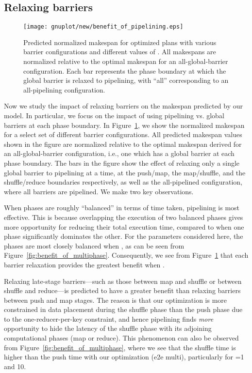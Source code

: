 \subsection{Relaxing barriers}
\label{subsec:barriers}

\begin{figure}[htbp]
  \centering
  \texttt{[image: gnuplot/new/benefit\_of\_pipelining.eps]}
  \caption{Predicted normalized makespan for optimized plans with various
  barrier configurations and different values of .
  All makespans are normalized relative to the optimal makespan for an
  all-global-barrier configuration.  Each bar represents the phase boundary at
  which the global barrier is relaxed to pipelining, with ``all'' corresponding
  to an all-pipelining configuration.
  \label{fig:benefit_of_pipelining}}
\end{figure}

Now we study the impact of relaxing barriers on the makespan predicted by our
model.
In particular, we focus on the impact of using pipelining vs. global barriers
at each phase boundary.
In Figure~\ref{fig:benefit_of_pipelining}, we show the normalized makespan for
a select set of different barrier configurations.
All predicted makespan values shown in the figure are normalized relative to
the optimal makespan derived for an all-global-barrier configuration, i.e., one
which has a global barrier at each phase boundary.
The bars in the figure show the effect of relaxing only a single global barrier
to pipelining at a time, at the push/map, the map/shuffle, and the
shuffle/reduce boundaries respectively, as well as  the all-pipelined
configuration, where all barriers are pipelined. We make two key observations.

\begin{myitemize}
  \item
  When phases are roughly ``balanced'' in terms of time taken, pipelining is
  most effective.
  This is because overlapping the execution of two balanced phases gives more
  opportunity for reducing their total execution time, compared to when one
  phase significantly dominates the other.
  For the parameters considered here, the phases are most closely balanced when
  , as can be seen from Figure~\ref{fig:benefit_of_multiphase}.
  Consequently, we see from Figure~\ref{fig:benefit_of_pipelining} that each
  barrier relaxation provides the greatest benefit when .

  \item
  Relaxing late-stage barriers---such as those between map and shuffle or
  between shuffle and reduce---is predicted to have a greater benefit than
  relaxing barriers between push and map stages.
  The reason is that our optimization is more constrained in data placement
  during the shuffle phase than the push phase due to the one-reducer-per-key
  constraint, and hence pipelining finds {\em more} opportunity to hide the
  latency of the shuffle phase with its adjoining computational phases (map or
  reduce).
  This phenomenon can also be observed from
  Figure~\ref{fig:benefit_of_multiphase}, where we see that the shuffle time is
  higher than the push time with our optimization (e2e multi), particularly for
  =1 and 10.
\end{myitemize}

